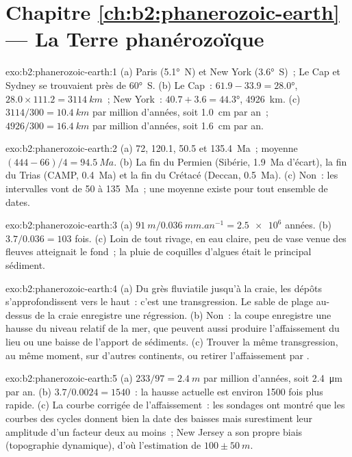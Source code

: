 \section*{Chapitre \ref{ch:b2:phanerozoic-earth} --- La Terre phanérozoïque}

\begin{solution}{exo:b2:phanerozoic-earth:1}
(a) Paris (\ang{5.1}~N) et New York (\ang{3.6}~S)~; Le Cap et Sydney se trouvaient près de \ang{60}~S.
(b) Le Cap~: $61.9 - 33.9 = \ang{28.0}$, $28.0 \times 111.2 = \qty{3114}{km}$~; New York~:
$40.7 + 3.6 = \ang{44.3}$, \qty{4926}{km}. (c) $3114/300 = \qty{10.4}{km}$ par million d'années,
soit \qty{1.0}{cm} par an~; $4926/300 = \qty{16.4}{km}$ par million d'années, soit \qty{1.6}{cm} par an.
\end{solution}

\begin{solution}{exo:b2:phanerozoic-earth:2}
(a) 72, 120.1, 50.5 et \qty{135.4}{Ma}~; moyenne $(444 - 66)/4 = \qty{94.5}{Ma}$. (b) La fin du
Permien (Sibérie, \qty{1.9}{Ma} d'écart), la fin du Trias (CAMP, \qty{0.4}{Ma}) et la fin du Crétacé
(Deccan, \qty{0.5}{Ma}). (c) Non~: les intervalles vont de 50 à \qty{135}{Ma}~; une moyenne existe
pour tout ensemble de dates.
\end{solution}

\begin{solution}{exo:b2:phanerozoic-earth:3}
(a) $\qty{91}{m}/\qty{0.036}{mm.an^{-1}} = \num{2.5e6}$ années. (b) $3.7/0.036 = 103$ fois. (c)
Loin de tout rivage, en eau claire, peu de vase venue des fleuves atteignait le fond~; la pluie
de coquilles d'algues était le principal sédiment.
\end{solution}

\begin{solution}{exo:b2:phanerozoic-earth:4}
(a) Du grès fluviatile jusqu'à la craie, les dépôts s'approfondissent vers le haut~: c'est une
transgression. Le sable de plage au-dessus de la craie enregistre une régression. (b) Non~: la coupe
enregistre une hausse du niveau relatif de la mer, que peuvent aussi produire l'affaissement du lieu ou une baisse de l'apport de sédiments. (c)
Trouver la même transgression, au même moment, sur d'autres continents, ou retirer l'affaissement
par .
\end{solution}

\begin{solution}{exo:b2:phanerozoic-earth:5}
(a) $233/97 = \qty{2.4}{m}$ par million d'années, soit \qty{2.4}{\micro m} par an. (b) $3.7/0.0024 =
1540$~: la hausse actuelle est environ 1500 fois plus rapide. (c) La courbe corrigée de l'affaissement~: les sondages
ont montré que les courbes des cycles donnent bien la date des baisses mais surestiment leur amplitude d'un
facteur deux au moins~; New Jersey a son propre biais (topographie dynamique), d'où l'estimation de $100 \pm
\qty{50}{m}$.
\end{solution}

